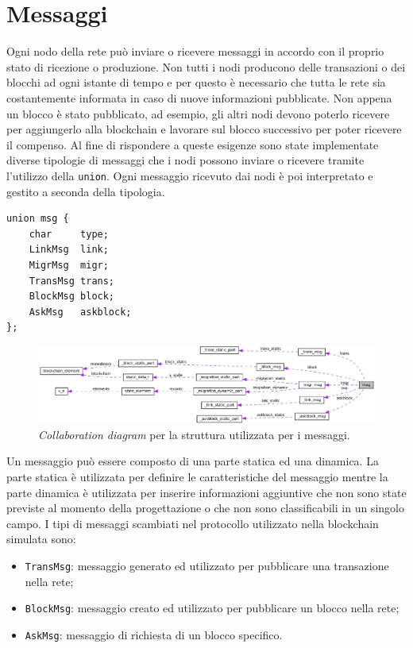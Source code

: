 \section{Messaggi}
Ogni nodo della rete può inviare o ricevere messaggi in accordo con il proprio stato di ricezione o produzione. Non tutti i nodi producono delle transazioni o dei blocchi ad ogni istante di tempo e per questo è necessario che tutta le rete sia costantemente informata in caso di nuove informazioni pubblicate. Non appena un blocco è stato pubblicato, ad esempio, gli altri nodi devono poterlo ricevere per aggiungerlo alla blockchain e lavorare sul blocco successivo per poter ricevere il compenso. Al fine di rispondere a queste esigenze sono state implementate diverse tipologie di messaggi che i nodi possono inviare o ricevere tramite l'utilizzo della \texttt{union}. Ogni messaggio ricevuto dai nodi è poi interpretato e gestito a seconda della tipologia.
\begin{code}
\begin{verbatim}
union msg {
    char     type;
    LinkMsg  link;
    MigrMsg  migr;
    TransMsg trans;
    BlockMsg block;
    AskMsg   askblock;
};
\end{verbatim}
\end{code}
\begin{figure}[H]
    \centering
    \includegraphics[width=\textwidth]{images/collaboration_union_msg.png}
    \caption{\textit{Collaboration diagram} per la struttura utilizzata per i messaggi.}
\end{figure}
Un messaggio può essere composto di una parte statica ed una dinamica. La parte statica è utilizzata per definire le caratteristiche del messaggio mentre la parte dinamica è utilizzata per inserire informazioni aggiuntive che non sono state previste al momento della progettazione o che non sono classificabili in un singolo campo.\newline
I tipi di messaggi scambiati nel protocollo utilizzato nella blockchain simulata sono:
\begin{itemize}
    \item \texttt{TransMsg}: messaggio generato ed utilizzato per pubblicare una transazione nella rete;
    \item \texttt{BlockMsg}: messaggio creato ed utilizzato per pubblicare un blocco nella rete;
    \item \texttt{AskMsg}: messaggio di richiesta di un blocco specifico.
\end{itemize}
